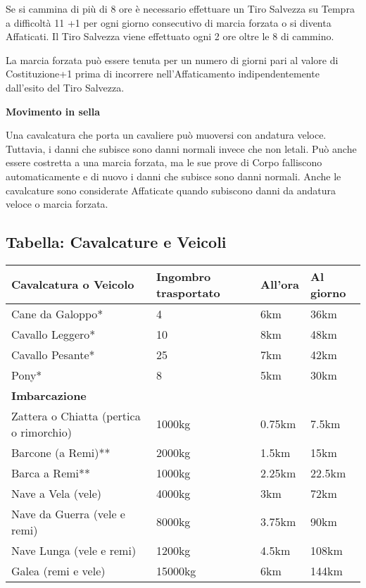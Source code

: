 \documentclass[12pt,a4paper,twoside,openany]{book}
\begin{document}
\begin{multicols}{2}
Se si cammina di più di 8 ore è necessario effettuare un Tiro Salvezza su Tempra a difficoltà 11 +1 per ogni giorno consecutivo di marcia forzata o si diventa Affaticati. Il Tiro Salvezza viene effettuato ogni 2 ore oltre le 8 di cammino.

La marcia forzata può essere tenuta per un numero di giorni pari al valore di Costituzione+1 prima di incorrere nell'Affaticamento indipendentemente dall'esito del Tiro Salvezza.


\textbf{Movimento in sella}\label{movimentoacavallo}

Una cavalcatura che porta un cavaliere può muoversi con andatura veloce. Tuttavia, i danni che subisce sono danni normali invece che non letali. Può anche essere costretta a una marcia forzata, ma le sue prove di Corpo falliscono automaticamente e di nuovo i danni che subisce sono danni normali. Anche le cavalcature sono considerate Affaticate quando subiscono danni da andatura veloce o marcia forzata.

\end{multicols}


\subsection{Tabella: Cavalcature e Veicoli}

\medskip

\label{tabella-cavalcature-e-veicoli}

\begin{tabularx}{0.95\textwidth}{lXXX}
\textbf{Cavalcatura o Veicolo} & \textbf{Ingombro trasportato} & \textbf{All'ora} & \textbf{Al giorno}\\
\toprule
Cane da Galoppo*  & 4 & 6km & 36km  \\
Cavallo Leggero*  & 10  & 8km & 48km  \\
Cavallo Pesante* & 25  & 7km & 42km  \\
Pony* & 8& 5km & 30km  \\
\textbf{Imbarcazione} &  &  & \\
\toprule
Zattera o Chiatta (pertica o rimorchio)  & 1000kg & 0.75km & 7.5km \\
Barcone (a Remi)**  & 2000kg & 1.5km  & 15km  \\
Barca a Remi**  & 1000kg & 2.25km & 22.5km  \\
Nave a Vela (vele)  & 4000kg & 3km  & 72km  \\
Nave da Guerra (vele e remi) & 8000kg & 3.75km & 90km  \\
Nave Lunga (vele e remi)  & 1200kg  & 4.5km  & 108km \\
Galea (remi e vele) & 15000kg & 6km  & 144km \\
\end{tabularx}
\end{document}
